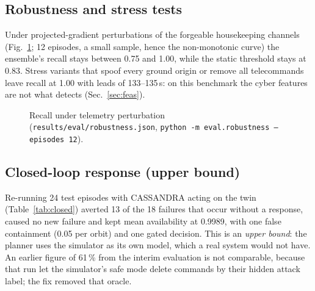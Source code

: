 \documentclass[conference]{IEEEtran}
\newcommand{\file}[1]{\texttt{#1}}
\begin{document}
\subsection{Robustness and stress tests}
Under projected-gradient perturbations of the forgeable housekeeping channels (Fig.~\ref{fig:robust};
12 episodes, a small sample, hence the non-monotonic curve) the ensemble's recall stays between 0.75
and 1.00, while the static threshold stays at 0.83. Stress variants that spoof every ground origin or
remove all telecommands leave recall at 1.00 with leads of 133--135\,s: on this benchmark the cyber
features are not what detects (Sec.~\ref{sec:feas}).

\begin{figure}[t]
\centering
{}
\caption{Recall under telemetry perturbation (\file{results/eval/robustness.json},
\texttt{python -m eval.robustness --episodes 12}).}
\label{fig:robust}
\end{figure}

\subsection{Closed-loop response (upper bound)}
Re-running 24 test episodes with CASSANDRA acting on the twin (Table~\ref{tab:closed}) averted 13 of the
18 failures that occur without a response, caused no new failure and kept mean availability at 0.9989,
with one false containment (0.05 per orbit) and one gated decision. This is an \emph{upper bound}: the
planner uses the simulator as its own model, which a real system would not have. An earlier figure of
61\,\% from the interim evaluation is not comparable, because that run let the simulator's safe mode
delete commands by their hidden attack label; the fix removed that oracle.
\end{document}
